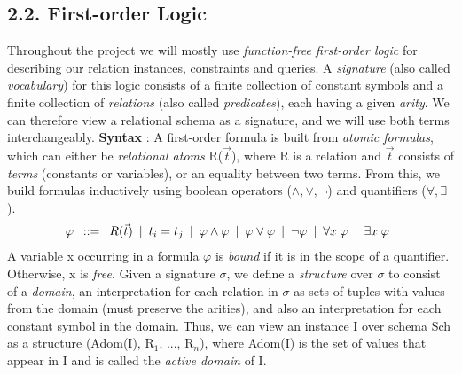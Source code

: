 \documentclass[11pt, a4paper, dvipsnames]{article}
\begin{document}
\subsection{2.2. First-order Logic}
Throughout the project we will mostly use \textit{function-free first-order logic} for describing our relation instances, constraints and queries. A \textit{signature} (also called \textit{vocabulary}) for this logic consists of a finite collection of constant symbols and a finite collection of \textit{relations} (also called \textit{predicates}), each having a given \textit{arity}. We can therefore view a relational schema as a signature, and we will use both terms interchangeably. \newline
\textbf{Syntax} : A first-order formula is built from \textit{atomic formulas}, which can either be \textit{relational atoms} R($\vec{t}$), where R is a relation and $\vec{t}$ consists of \textit{terms} (constants or variables), or an equality between two terms. From this, we build formulas inductively using boolean operators ($\wedge, \vee, \neg$) and quantifiers ($\forall, \exists$).
\begin{gather*}
\varphi \hspace{0.5em} ::= \hspace{0.5em} R(\vec{t}) \hspace{0.5em} |\hspace{0.5em} t_{i} = t_{j} \hspace{0.5em}| \hspace{0.5em}\varphi \wedge \varphi \hspace{0.5em}| \hspace{0.5em}\varphi \vee \varphi \hspace{0.5em}| \hspace{0.5em}\neg \varphi \hspace{0.5em}| \hspace{0.5em}\forall x \hspace{0.25em} \varphi \hspace{0.5em}|\hspace{0.5em} \exists x \hspace{0.25em} \varphi\hspace{0.5em}
\end{gather*}
A variable x occurring in a formula $\varphi$ is \textit{bound} if it is in the scope of a quantifier. Otherwise, x is \textit{free}.\newline
Given a signature $\sigma$, we define a \textit{structure} over $\sigma$ to consist of a \textit{domain}, an interpretation for each relation in $\sigma$ as sets of tuples with values from the domain (must preserve the arities), and also an interpretation for each constant symbol in the domain. Thus, we can view an instance I over schema Sch as a structure (Adom(I), R$_{1}$, ..., R$_{n}$), where Adom(I) is the set of values that appear in I and is called the \textit{active domain} of I.\newline
\end{document}
